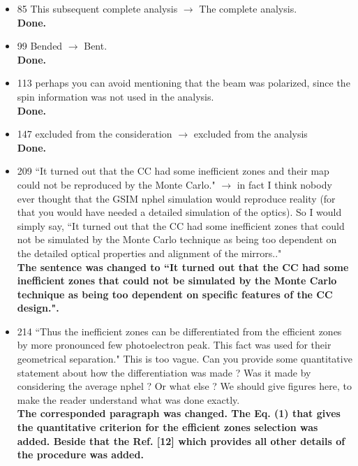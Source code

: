\documentclass[,superscriptaddress,showpacs,amssymb,amsmath,amsfonts,linenumbers,article]{revtex4-1}
\begin{document}
\begin{itemize}


\item 85 This subsequent complete analysis $\rightarrow$ The complete analysis.\\
{\bf Done.}

\item 99 Bended $\rightarrow$ Bent.\\
{\bf Done.}

\item 113 perhaps you can avoid mentioning that the beam was polarized, since the spin information was not used in the analysis.\\
{\bf Done.}

\item 147 excluded from the consideration $\rightarrow$ excluded from the analysis\\
{\bf Done.}

\item 209 ``It turned out that the CC had some inefficient zones and their map could not be reproduced
by the Monte Carlo." $\rightarrow$ in fact I think nobody ever thought that the GSIM nphel simulation would
reproduce reality (for that you would have needed a detailed simulation of the optics). So I would
simply say, ``It turned out that the CC had some inefficient zones that could not be simulated by the
Monte Carlo technique as being too dependent on the detailed optical properties and alignment of
the mirrors.."\\
{\bf The sentence was changed to ``It turned out that the CC had some inefficient zones  that could not be simulated by the Monte Carlo technique as being too dependent on specific features of the CC design.".}

\item 214 ``Thus the inefficient zones can be differentiated from the efficient zones by more pronounced
few photoelectron peak. This fact was used for their geometrical separation." This is too vague. Can
you provide some quantitative statement about how the differentiation was made ? Was it made
by considering the average nphel ? Or what else ? We should give figures here, to make the reader
understand what was done exactly.\\
{\bf The corresponded paragraph was changed. The Eq. (1) that gives the quantitative criterion for the efficient zones selection was added. Beside that the Ref. [12] which provides all other details of the procedure was added.}


\end{itemize}
\end{document}
